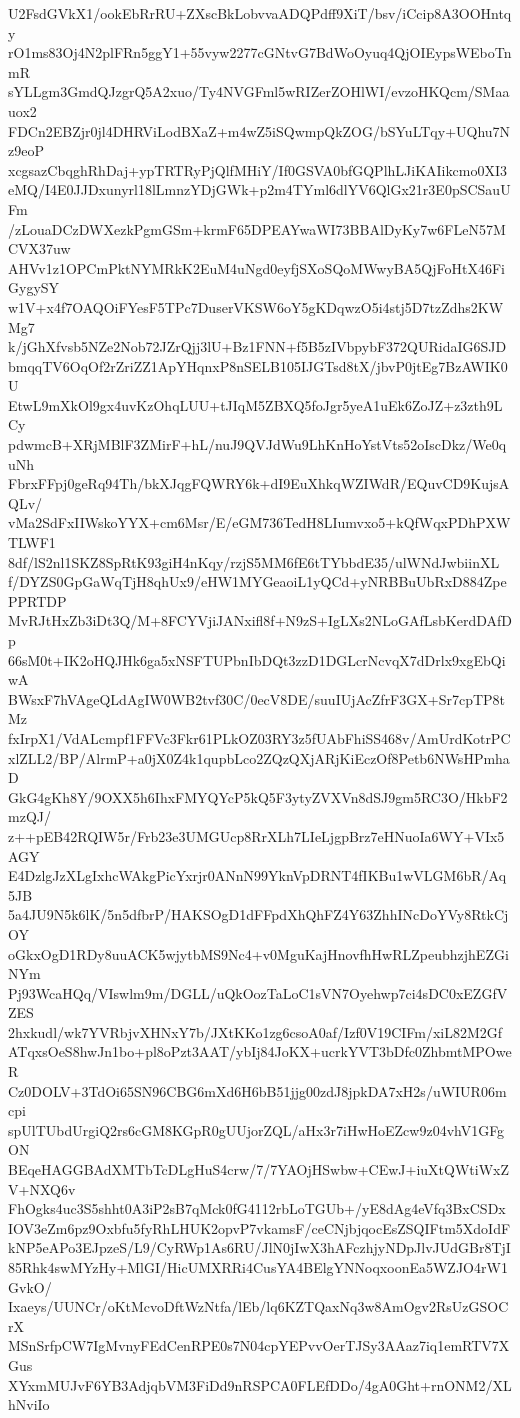 U2FsdGVkX1/ookEbRrRU+ZXscBkLobvvaADQPdff9XiT/bsv/iCcip8A3OOHntqy
rO1ms83Oj4N2plFRn5ggY1+55vyw2277cGNtvG7BdWoOyuq4QjOIEypsWEboTnmR
sYLLgm3GmdQJzgrQ5A2xuo/Ty4NVGFml5wRIZerZOHlWI/evzoHKQcm/SMaauox2
FDCn2EBZjr0jl4DHRViLodBXaZ+m4wZ5iSQwmpQkZOG/bSYuLTqy+UQhu7Nz9eoP
xcgsazCbqghRhDaj+ypTRTRyPjQlfMHiY/If0GSVA0bfGQPlhLJiKAIikcmo0XI3
eMQ/I4E0JJDxunyrl18lLmnzYDjGWk+p2m4TYml6dlYV6QlGx21r3E0pSCSauUFm
/zLouaDCzDWXezkPgmGSm+krmF65DPEAYwaWI73BBAlDyKy7w6FLeN57MCVX37uw
AHVv1z1OPCmPktNYMRkK2EuM4uNgd0eyfjSXoSQoMWwyBA5QjFoHtX46FiGygySY
w1V+x4f7OAQOiFYesF5TPc7DuserVKSW6oY5gKDqwzO5i4stj5D7tzZdhs2KWMg7
k/jGhXfvsb5NZe2Nob72JZrQjj3lU+Bz1FNN+f5B5zIVbpybF372QURidaIG6SJD
bmqqTV6OqOf2rZriZZ1ApYHqnxP8nSELB105IJGTsd8tX/jbvP0jtEg7BzAWIK0U
EtwL9mXkOl9gx4uvKzOhqLUU+tJIqM5ZBXQ5foJgr5yeA1uEk6ZoJZ+z3zth9LCy
pdwmcB+XRjMBlF3ZMirF+hL/nuJ9QVJdWu9LhKnHoYstVts52oIscDkz/We0quNh
FbrxFFpj0geRq94Th/bkXJqgFQWRY6k+dI9EuXhkqWZIWdR/EQuvCD9KujsAQLv/
vMa2SdFxIIWskoYYX+cm6Msr/E/eGM736TedH8LIumvxo5+kQfWqxPDhPXWTLWF1
8df/lS2nl1SKZ8SpRtK93giH4nKqy/rzjS5MM6fE6tTYbbdE35/ulWNdJwbiinXL
f/DYZS0GpGaWqTjH8qhUx9/eHW1MYGeaoiL1yQCd+yNRBBuUbRxD884ZpePPRTDP
MvRJtHxZb3iDt3Q/M+8FCYVjiJANxifl8f+N9zS+IgLXs2NLoGAfLsbKerdDAfDp
66sM0t+IK2oHQJHk6ga5xNSFTUPbnIbDQt3zzD1DGLcrNcvqX7dDrlx9xgEbQiwA
BWsxF7hVAgeQLdAgIW0WB2tvf30C/0ecV8DE/suuIUjAcZfrF3GX+Sr7cpTP8tMz
fxIrpX1/VdALcmpf1FFVc3Fkr61PLkOZ03RY3z5fUAbFhiSS468v/AmUrdKotrPC
xlZLL2/BP/AlrmP+a0jX0Z4k1qupbLco2ZQzQXjARjKiEczOf8Petb6NWsHPmhaD
GkG4gKh8Y/9OXX5h6IhxFMYQYcP5kQ5F3ytyZVXVn8dSJ9gm5RC3O/HkbF2mzQJ/
z++pEB42RQIW5r/Frb23e3UMGUcp8RrXLh7LIeLjgpBrz7eHNuoIa6WY+VIx5AGY
E4DzlgJzXLgIxhcWAkgPicYxrjr0ANnN99YknVpDRNT4fIKBu1wVLGM6bR/Aq5JB
5a4JU9N5k6lK/5n5dfbrP/HAKSOgD1dFFpdXhQhFZ4Y63ZhhINcDoYVy8RtkCjOY
oGkxOgD1RDy8uuACK5wjytbMS9Nc4+v0MguKajHnovfhHwRLZpeubhzjhEZGiNYm
Pj93WcaHQq/VIswlm9m/DGLL/uQkOozTaLoC1sVN7Oyehwp7ci4sDC0xEZGfVZES
2hxkudl/wk7YVRbjvXHNxY7b/JXtKKo1zg6csoA0af/Izf0V19CIFm/xiL82M2Gf
ATqxsOeS8hwJn1bo+pl8oPzt3AAT/ybIj84JoKX+ucrkYVT3bDfc0ZhbmtMPOweR
Cz0DOLV+3TdOi65SN96CBG6mXd6H6bB51jjg00zdJ8jpkDA7xH2s/uWIUR06mcpi
spUlTUbdUrgiQ2rs6cGM8KGpR0gUUjorZQL/aHx3r7iHwHoEZcw9z04vhV1GFgON
BEqeHAGGBAdXMTbTcDLgHuS4crw/7/7YAOjHSwbw+CEwJ+iuXtQWtiWxZV+NXQ6v
FhOgks4uc3S5shht0A3iP2sB7qMck0fG4112rbLoTGUb+/yE8dAg4eVfq3BxCSDx
IOV3eZm6pz9Oxbfu5fyRhLHUK2opvP7vkamsF/ceCNjbjqocEsZSQIFtm5XdoIdF
kNP5eAPo3EJpzeS/L9/CyRWp1As6RU/JlN0jIwX3hAFczhjyNDpJlvJUdGBr8TjI
85Rhk4swMYzHy+MlGI/HicUMXRRi4CusYA4BElgYNNoqxoonEa5WZJO4rW1GvkO/
Ixaeys/UUNCr/oKtMcvoDftWzNtfa/lEb/lq6KZTQaxNq3w8AmOgv2RsUzGSOCrX
MSnSrfpCW7IgMvnyFEdCenRPE0s7N04cpYEPvvOerTJSy3AAaz7iq1emRTV7XGus
XYxmMUJvF6YB3AdjqbVM3FiDd9nRSPCA0FLEfDDo/4gA0Ght+rnONM2/XLhNviIo
